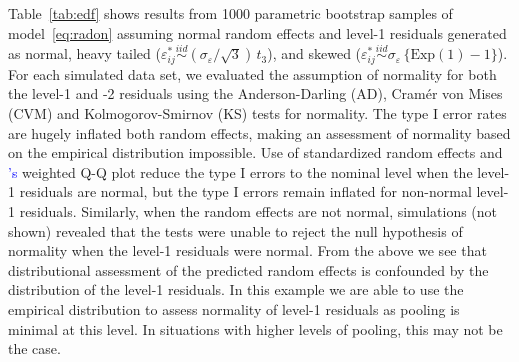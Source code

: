 \documentclass[12pt]{article} %
\newcommand{\citetapos}[1]{\citeauthor{#1}{\textcolor{blue}{'s}} }
\newcommand{\al}[1]{{\color{red} #1}}
\begin{document}
Table~\ref{tab:edf} shows results from 1000 parametric bootstrap samples of model~\eqref{eq:radon} assuming normal random effects and level-1 residuals generated as normal, heavy tailed ($\varepsilon_{ij}^* \overset{iid}{\sim} (\sigma_{\varepsilon} / \sqrt{3})\, t_3$), and skewed ($\varepsilon_{ij}^* \overset{iid}{\sim} \sigma_{\varepsilon} \, \{ \text{Exp}(1) - 1 \}$).
For each simulated data set, we evaluated the assumption of normality for both the level-1 and -2 residuals using the Anderson-Darling (AD), Cram{\'e}r von Mises (CVM) and  Kolmogorov-Smirnov (KS) tests for normality.  
The type I error rates are hugely inflated both random effects, making an assessment of normality based on the empirical distribution impossible. Use of standardized random effects and \citetapos{Lange:1989uu} weighted Q-Q plot reduce the type I errors to the nominal level when the level-1 residuals are normal, but the type I errors remain inflated for non-normal level-1 residuals. Similarly, when the random effects are not normal, simulations (not shown) revealed that the tests were unable to reject the null hypothesis of normality when the level-1 residuals were normal. \al{From the above we see that distributional assessment of the predicted random effects is confounded by the distribution of the level-1 residuals.}
In this example we are able to use the empirical distribution to assess normality of  level-1 residuals  as  pooling is minimal at this level. In situations with higher levels of pooling, this may not be the case.
\end{document}
